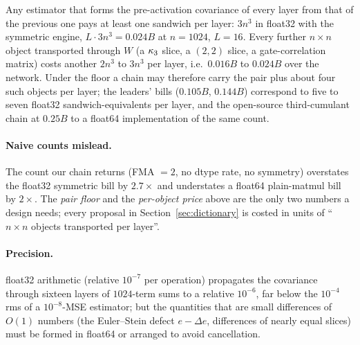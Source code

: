 \begin{proposition}\label{prop:floor}
Any estimator that forms the pre-activation covariance of every layer from that of the previous one pays at least
one sandwich per layer: $3n^3$ in float32 with the symmetric engine, $L\cdot3n^3=0.024B$ at $n=1024$, $L=16$.
Every further $n\times n$ object transported through $W$ (a $\kappa_3$ slice, a $(2,2)$ slice, a gate-correlation
matrix) costs another $2n^3$ to $3n^3$ per layer, i.e.\ $0.016B$ to $0.024B$ over the network. Under the floor a
chain may therefore carry the pair plus about four such objects per layer; the leaders' bills ($0.105B$,
$0.144B$) correspond to five to seven float32 sandwich-equivalents per layer, and the open-source third-cumulant
chain at $0.25B$ to a float64 implementation of the same count.
\end{proposition}

\paragraph{Naive counts mislead.} The count our chain returns (FMA $=2$, no dtype rate, no symmetry) overstates
the float32 symmetric bill by $2.7\times$ and understates a float64 plain-matmul bill by $2\times$. The
\emph{pair floor} and the \emph{per-object price} above are the only two numbers a design needs; every proposal in
Section~\ref{sec:dictionary} is costed in units of ``$n\times n$ objects transported per layer''.

\paragraph{Precision.} float32 arithmetic (relative $10^{-7}$ per operation) propagates the covariance through
sixteen layers of $1024$-term sums to a relative $10^{-6}$, far below the $10^{-4}$ rms of a $10^{-8}$-MSE
estimator; but the quantities that are small differences of $O(1)$ numbers (the Euler--Stein defect
$e-\Delta e$, differences of nearly equal slices) must be formed in float64 or arranged to avoid cancellation.

